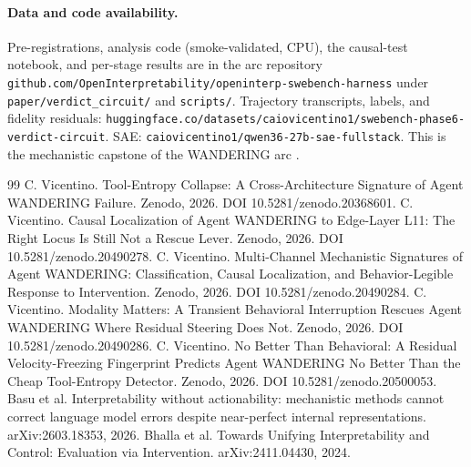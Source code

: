 \documentclass[11pt]{article}
\begin{document}
\paragraph{Data and code availability.} Pre-registrations, analysis code (smoke-validated, CPU), the causal-test notebook, and per-stage results are in the arc repository \texttt{github.com/OpenInterpretability/openinterp-swebench-harness} under \texttt{paper/verdict\_circuit/} and \texttt{scripts/}. Trajectory transcripts, labels, and fidelity residuals: \texttt{huggingface.co/datasets/caiovicentino1/swebench-phase6-verdict-circuit}. SAE: \texttt{caiovicentino1/qwen36-27b-sae-fullstack}. This is the mechanistic capstone of the WANDERING arc \cite{tool_entropy,residual_nulls,multichannel,modality,companion_note}.

\begin{thebibliography}{99}
 C. Vicentino. Tool-Entropy Collapse: A Cross-Architecture Signature of Agent WANDERING Failure. Zenodo, 2026. DOI 10.5281/zenodo.20368601.
 C. Vicentino. Causal Localization of Agent WANDERING to Edge-Layer L11: The Right Locus Is Still Not a Rescue Lever. Zenodo, 2026. DOI 10.5281/zenodo.20490278.
 C. Vicentino. Multi-Channel Mechanistic Signatures of Agent WANDERING: Classification, Causal Localization, and Behavior-Legible Response to Intervention. Zenodo, 2026. DOI 10.5281/zenodo.20490284.
 C. Vicentino. Modality Matters: A Transient Behavioral Interruption Rescues Agent WANDERING Where Residual Steering Does Not. Zenodo, 2026. DOI 10.5281/zenodo.20490286.
 C. Vicentino. No Better Than Behavioral: A Residual Velocity-Freezing Fingerprint Predicts Agent WANDERING No Better Than the Cheap Tool-Entropy Detector. Zenodo, 2026. DOI 10.5281/zenodo.20500053.
 Basu et al. Interpretability without actionability: mechanistic methods cannot correct language model errors despite near-perfect internal representations. arXiv:2603.18353, 2026.
 Bhalla et al. Towards Unifying Interpretability and Control: Evaluation via Intervention. arXiv:2411.04430, 2024.
\end{thebibliography}
\end{document}
